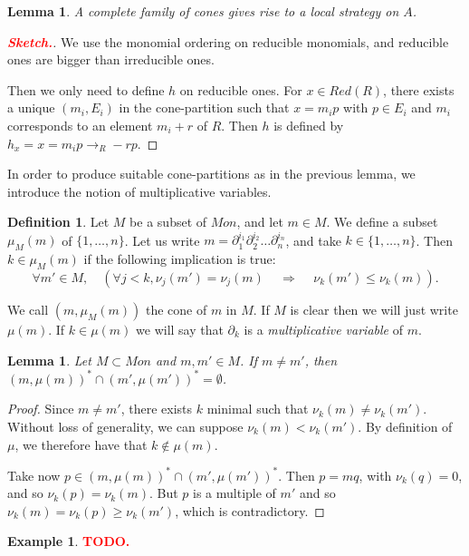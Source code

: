 \documentclass[10pt]{easychair}
\newtheorem{lemma}[theorem]{Lemma}
\theoremstyle{definition}
\newtheorem{definition}[theorem]{Definition}
\newtheorem{example}[theorem]{Example}
\newcommand\todo[1]{{\bf\textcolor{red}{#1.}}}
\newcommand\rewR{\to_R}
\begin{document}
 \begin{lemma}
  A complete family of cones gives rise to a local strategy on $A$. 
\end{lemma}
\begin{proof}[\todo{Sketch}]
  We use the monomial ordering on reducible monomials, and reducible ones are bigger than irreducible ones.

  Then we only need to define $h$ on reducible ones. For $x \in Red(R)$, there exists a unique $(m_i,E_i)$ in the cone-partition such that $x=m_i p$ with $p \in E_i$ and $m_i$ corresponds to an element $m_i + r$ of $R$. Then $h$ is defined by $h_x = x = m_ip  \rewR -rp$.
\end{proof}


In order to produce suitable cone-partitions as in the previous lemma, we introduce the notion of multiplicative variables.

\begin{definition}
  Let $M$ be a subset of $Mon$, and let $m  \in M$. We define a subset $\mu_M(m)$ of $\{1,\ldots,n\}$. Let us write $m = \partial_1^{i_1}\partial_2^{i_2}\ldots \partial_n^{i_n}$, and take $k \in \{1,\ldots,n\}$. Then $k \in \mu_M(m)$ if the following implication is true:
  \[
\forall m' \in M, \quad (\forall j < k, \nu_j(m') = \nu_j(m) \, \quad \Rightarrow \quad \, \nu_k(m') \leq \nu_k(m)).
  \]
  

  We call $(m,\mu_M(m))$ the cone of $m$ in $M$. If $M$ is clear then we will just write $\mu(m)$. If $k \in \mu(m)$ we will say that $\partial_k$ is a \emph{multiplicative variable} of $m$.
\end{definition}

\begin{lemma}\label{lem:multiplicative_cones_disjoint}
Let $M \subset Mon$ and $m,m' \in M$. If $m \neq m'$, then $(m,\mu(m))^* \cap (m',\mu(m'))^* = \emptyset$.
\end{lemma}
\begin{proof}
   Since $m \neq m'$, there exists $k$ minimal such that $\nu_k(m) \neq \nu_k(m')$. Without loss of generality, we can suppose $\nu_k(m) < \nu_k(m')$. By definition of $\mu$, we therefore have that $k \notin \mu(m)$.

   Take now $p \in (m,\mu(m))^* \cap (m',\mu(m'))^*$. Then $p = mq$, with $\nu_k(q) = 0$, and so $\nu_k(p) = \nu_k(m)$. But $p$ is a multiple of $m'$ and so $\nu_k(m) = \nu_k(p) \geq \nu_k(m')$, which is contradictory.
 \end{proof}

 \begin{example}
\todo{TODO}
 \end{example}
\end{document}
